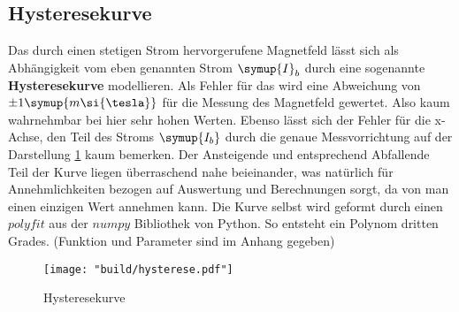 \subsection{Hysteresekurve}
\label{sec:Hysteresekurve}

 
 Das durch einen stetigen Strom hervorgerufene Magnetfeld lässt sich als Abhängigkeit vom eben genannten Strom $\symup{I}_b$ durch eine sogenannte \textbf{Hysteresekurve} modellieren.
 Als Fehler für das wird eine Abweichung von $\pm 1 \symup{m\si{\tesla}}$ für die Messung des Magnetfeld gewertet. Also kaum wahrnehmbar bei hier sehr hohen Werten. Ebenso lässt sich der Fehler für die x-Achse, den Teil des Stroms 
 $\symup{I_b}$ durch die genaue Messvorrichtung auf der Darstellung \ref{fig:Bfeld} kaum bemerken.
 Der Ansteigende und entsprechend Abfallende Teil der Kurve liegen überraschend nahe beieinander, was natürlich für Annehmlichkeiten bezogen auf Auswertung und Berechnungen sorgt, da von man einen einzigen Wert annehmen kann.
 Die Kurve selbst wird geformt durch einen $polyfit$ aus der $numpy$ Bibliothek von Python. So entsteht ein Polynom dritten Grades. (Funktion und Parameter sind im Anhang gegeben)

\begin{figure}
    \centering
    \texttt{[image: "build/hysterese.pdf"]}
    \caption{Hysteresekurve}
    \label{fig:Bfeld}
 \end{figure}
